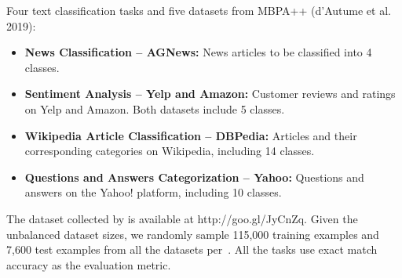 \documentclass{article} %
\begin{document}
\noindent Four text classification tasks and five datasets from MBPA++ (d’Autume et al. 2019):

\begin{itemize}
\item \textbf{News Classification -- AGNews:} News articles to be classified into 4 classes.
\item \textbf{Sentiment Analysis -- Yelp and Amazon:} Customer reviews and ratings on Yelp and Amazon. Both datasets include 5 classes.
\item \textbf{Wikipedia Article Classification -- DBPedia:} Articles and their corresponding categories on Wikipedia, including 14 classes.
\item \textbf{Questions and Answers Categorization -- Yahoo:} Questions and answers on the Yahoo! platform, including 10 classes.
\end{itemize}
The dataset collected by \citet{cls} is available at http://goo.gl/JyCnZq. Given the unbalanced dataset sizes, we randomly sample 115,000 training examples and 7,600 test examples from all the datasets per~\citet{d2019episodic}. 
All the tasks use exact match accuracy as the evaluation metric.

\end{document}
